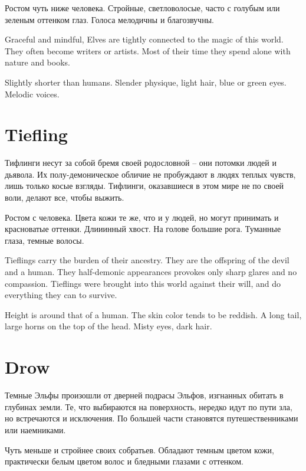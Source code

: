 \documentclass[a5paper,11pt]{book}
\begin{document}
\begin{multicols}{2}
\begin{ru}
Ростом чуть ниже человека. Стройные, светловолосые, часто с голубым или зеленым оттенком глаз. Голоса мелодичны и благозвучны.
\end{ru}

\begin{en}
Graceful and mindful, Elves are tightly connected to the magic of this world. They often become writers or artists. Most of their time they spend alone with nature and books.

Slightly shorter than humans. Slender physique, light hair, blue or green eyes. Melodic voices.
\end{en}

\section{Tiefling}
\begin{ru}
Тифлинги несут за собой бремя своей родословной -- они потомки людей и дьявола. Их полу-демоническое обличие не пробуждают в людях теплых чувств, лишь только косые взгляды. Тифлинги, оказавшиеся в этом мире не по своей воли, делают все, чтобы выжить.

Ростом с человека. Цвета кожи те же, что и у людей, но могут принимать и красноватые оттенки. Длииинный хвост. На голове большие рога. Туманные глаза, темные волосы.
\end{ru}

\begin{en}
Tieflings carry the burden of their ancestry. They are the offspring of the devil and a human. They half-demonic appearances provokes only sharp glares and no compassion. Tieflings were brought into this world against their will, and do everything they can to survive.

Height is around that of a human. The skin color tends to be reddish. A long tail, large horns on the top of the head. Misty eyes, dark hair.
\end{en}

\section{Drow}
\begin{ru}
Темные Эльфы произошли от дверней подрасы Эльфов, изгнанных обитать в глубинах земли. Те, что выбираются на поверхность, нередко идут по пути зла, но встречаются и исключения. По большей части становятся путешественниками или наемниками.

Чуть меньше и стройнее своих собратьев. Обладают темным цветом кожи, практически белым цветом волос и бледными глазами с оттенком.
\end{ru}


\end{multicols}
\end{document}
